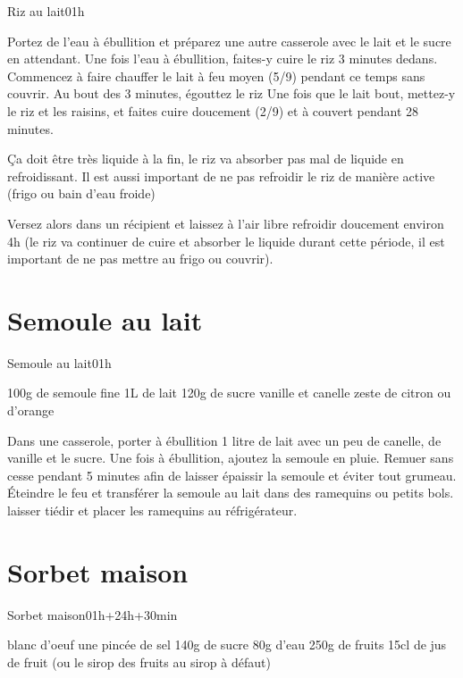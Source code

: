 {\begin{recette}{Riz au lait}{0}{1h}{}
\begin{preparation}
\etape Portez de l'eau à ébullition et préparez une autre casserole avec le lait et le sucre en attendant.
\etape Une fois l'eau à ébullition, faites-y cuire le riz 3 minutes dedans. Commencez à faire chauffer le lait à feu moyen (5/9) pendant ce temps sans couvrir. 
\etape Au bout des 3 minutes, égouttez le riz
\etape Une fois que le lait bout, mettez-y le riz et les raisins, et faites cuire doucement (2/9) et à couvert pendant 28 minutes. 
\begin{remarque}
Ça doit être très liquide à la fin, le riz va absorber pas mal de liquide en refroidissant. Il est aussi important de ne pas refroidir le riz de manière active (frigo ou bain d'eau froide)
\end{remarque}
\etape Versez alors dans un récipient et laissez à l'air libre refroidir doucement environ 4h (le riz va continuer de cuire et absorber le liquide durant cette période, il est important de ne pas mettre au frigo ou couvrir).
\end{preparation}
\end{recette}

\section{Semoule au lait}
\begin{recette}{Semoule au lait}{0}{1h}{}
\begin{ingredients}[4 pers.]
\ingredient 100g de semoule fine
\ingredient 1L de lait
\ingredient 120g de sucre
\ingredient vanille et canelle
\ingredient zeste de citron ou d'orange
\end{ingredients}

\begin{preparation}
\etape Dans une casserole, porter à ébullition 1 litre de lait avec un peu de canelle, de vanille et le sucre. Une fois à ébullition, ajoutez la semoule en pluie.
\etape Remuer sans cesse pendant 5 minutes afin de laisser épaissir la semoule et éviter tout grumeau.
\etape Éteindre le feu et transférer la semoule au lait dans des ramequins ou petits bols. laisser tiédir et placer les ramequins au réfrigérateur.
\end{preparation}
\end{recette}

\section{Sorbet maison}
\begin{recette}{Sorbet maison}{0}{1h+24h+30min}{}
\begin{ingredients}
 blanc d'oeuf
\ingredient une pincée de sel
\ingredient 140g de sucre
\ingredient 80g d'eau
\ingredient 250g de fruits
\ingredient 15cl de jus de fruit (ou le sirop des fruits au sirop à défaut)
\end{ingredients}


\end{recette}}
